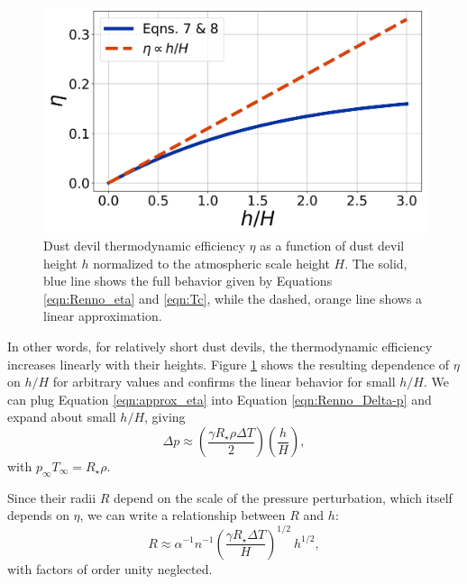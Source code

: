 \documentclass{aastex63}
\begin{document}
\begin{figure}
    \centering
    \includegraphics[width=\textwidth]{eta_vs_h-over-H.png}
    \caption{Dust devil thermodynamic efficiency $\eta$ as a function of dust devil height $h$ normalized to the atmospheric scale height $H$. The solid, blue line shows the full behavior given by Equations \ref{eqn:Renno_eta} and \ref{eqn:Tc}, while the dashed, orange line shows a linear approximation.}
    \label{fig:eta_vs_h-over-H}
\end{figure}{}

In other words, for relatively short dust devils, the thermodynamic efficiency increases linearly with their heights. Figure \ref{fig:eta_vs_h-over-H} shows the resulting dependence of $\eta$ on $h/H$ for arbitrary values and confirms the linear behavior for small $h/H$. We can plug Equation \ref{eqn:approx_eta} into Equation \ref{eqn:Renno_Delta-p} and expand about small $h/H$, giving
\begin{equation}
    \Delta p \approx \left( \dfrac{\gamma R_\star \rho \Delta T}{2} \right) \left( \dfrac{h}{H} \right) \label{eqn:approx_Delta-p},
\end{equation}
with $p_\infty T_\infty = R_\star \rho$.

Since their radii $R$ depend on the scale of the pressure perturbation, which itself depends on $\eta$, we can write a relationship between $R$ and $h$:
\begin{equation}
    R \approx \alpha^{-1} n^{-1} \left( \dfrac{\gamma R_\star \Delta T}{H} \right)^{1/2}\ h^{1/2},\label{eqn:R_vs_h}
\end{equation}{}
with factors of order unity neglected.
\end{document}
